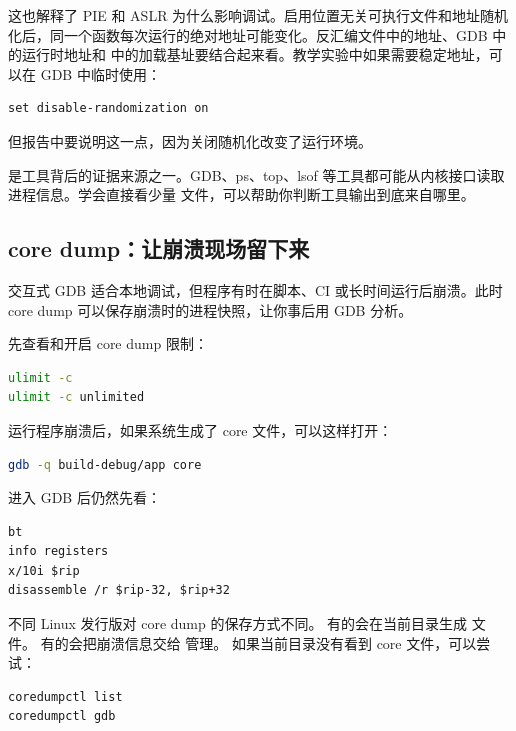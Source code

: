 这也解释了 PIE 和 ASLR 为什么影响调试。启用位置无关可执行文件和地址随机化后，同一个函数每次运行的绝对地址可能变化。反汇编文件中的地址、GDB 中的运行时地址和  中的加载基址要结合起来看。教学实验中如果需要稳定地址，可以在 GDB 中临时使用：

\begin{lstlisting}
set disable-randomization on
\end{lstlisting}

但报告中要说明这一点，因为关闭随机化改变了运行环境。

\begin{deepdive}
 是工具背后的证据来源之一。GDB、ps、top、lsof 等工具都可能从内核接口读取进程信息。学会直接看少量  文件，可以帮助你判断工具输出到底来自哪里。
\end{deepdive}

\subsection{core dump：让崩溃现场留下来}

交互式 GDB 适合本地调试，但程序有时在脚本、CI 或长时间运行后崩溃。此时 core dump 可以保存崩溃时的进程快照，让你事后用 GDB 分析。

先查看和开启 core dump 限制：

\begin{lstlisting}[language=bash]
ulimit -c
ulimit -c unlimited
\end{lstlisting}

运行程序崩溃后，如果系统生成了 core 文件，可以这样打开：

\begin{lstlisting}[language=bash]
gdb -q build-debug/app core
\end{lstlisting}

进入 GDB 后仍然先看：

\begin{lstlisting}
bt
info registers
x/10i $rip
disassemble /r $rip-32, $rip+32
\end{lstlisting}

不同 Linux 发行版对 core dump 的保存方式不同。
有的会在当前目录生成  文件。
有的会把崩溃信息交给  管理。
如果当前目录没有看到 core 文件，可以尝试：

\begin{lstlisting}[language=bash]
coredumpctl list
coredumpctl gdb
\end{lstlisting}

